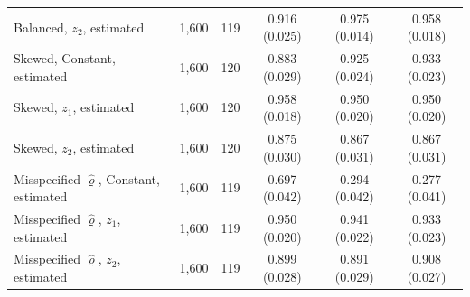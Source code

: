 \begin{tabular}{lrrccc}
Balanced, $z_2$, estimated & 1,600 & 119 & 0.916 (0.025) & 0.975 (0.014) & 0.958 (0.018) \\
Skewed, Constant, estimated & 1,600 & 120 & 0.883 (0.029) & 0.925 (0.024) & 0.933 (0.023) \\
Skewed, $z_1$, estimated & 1,600 & 120 & 0.958 (0.018) & 0.950 (0.020) & 0.950 (0.020) \\
Skewed, $z_2$, estimated & 1,600 & 120 & 0.875 (0.030) & 0.867 (0.031) & 0.867 (0.031) \\
Misspecified $\hat\varrho$, Constant, estimated & 1,600 & 119 & 0.697 (0.042) & 0.294 (0.042) & 0.277 (0.041) \\
Misspecified $\hat\varrho$, $z_1$, estimated & 1,600 & 119 & 0.950 (0.020) & 0.941 (0.022) & 0.933 (0.023) \\
Misspecified $\hat\varrho$, $z_2$, estimated & 1,600 & 119 & 0.899 (0.028) & 0.891 (0.029) & 0.908 (0.027) \\
\bottomrule
\end{tabular}
